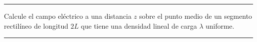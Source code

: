 \begin{ejercicio}
\medskip
{\color{gray}
\hrule
}

% 
\item
\begin{subejercicio}
  Calcule el campo eléctrico a una distancia $z$ sobre el punto medio
  de un segmento rectilíneo de longitud $2L$ que tiene una densidad
  lineal de carga $\lambda$ uniforme.
\end{subejercicio}

\medskip
{\color{gray}
\hrule
}





 
\end{ejercicio}


